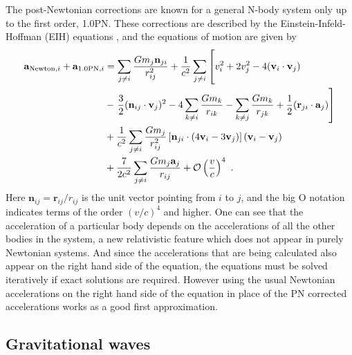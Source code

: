 \documentclass[english, oneside]{HYgradu}
\begin{document}
The post-Newtonian corrections are known for a general N-body system only up to the first order, 1.0PN. These corrections are described by the Einstein-Infeld-Hoffman (EIH) equations \citep{einstein:1938}, and the equations of motion are given by
\begin{align}
\mathbf{a}_{\mathrm{Newton},i} + \mathbf{a}_{\mathrm{1.0PN}, i} &= \sum_{j \neq i} \frac{G m_j \mathbf{n}_{ji}}{r_{ij}^2} + \frac{1}{c^2} \sum_{j \neq i} \left[ \vphantom{\sum_{k \neq j} \frac{G m_k}{r_{jk}}} v_i^2 + 2 v_j^2 - 4(\mathbf{v}_i \cdot \mathbf{v}_j) \right. \nonumber \\
&- \left. \frac{3}{2}(\mathbf{n}_{ij} \cdot \mathbf{v}_j)^2 - 4 \sum_{k \neq i} \frac{G m_k}{r_{ik}} - \sum_{k \neq j} \frac{G m_k}{r_{jk}} + \frac{1}{2} (\mathbf{r}_{ji} \cdot \mathbf{a}_j) \right] \nonumber \\
&+ \frac{1}{c^2} \sum_{j \neq i} \frac{G m_j}{r_{ij}^2} \left[ \mathbf{n}_{ji} \cdot (4 \mathbf{v}_i - 3 \mathbf{v}_j) \right] (\mathbf{v}_i - \mathbf{v}_j) \nonumber \\
&+ \frac{7}{2c^2} \sum_{j \neq i} \frac{G m_j \mathbf{a}_j}{r_{ij}} + \mathcal{O} \left( \frac{v}{c} \right)^4 \ . \label{equ:PN1Nbody}
\end{align}
Here $\mathbf{n}_{ij} = \mathbf{r}_{ij}/r_{ij}$ is the unit vector pointing from $i$ to $j$, and the big O notation indicates terms of the order $(v/c)^4$ and higher. One can see that the acceleration of a particular body depends on the accelerations of all the other bodies in the system, a new relativistic feature which does not appear in purely Newtonian systems. And since the accelerations that are being calculated also appear on the right hand side of the equation, the equations must be solved iteratively if exact solutions are required. However using the usual Newtonian accelerations on the right hand side of the equation in place of the PN corrected accelerations works as a good first approximation.

\subsection{Gravitational waves}
\end{document}
